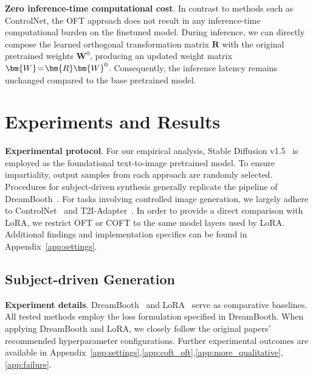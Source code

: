 \textbf{Zero inference-time computational cost}. In contrast to methods such as ControlNet, the OFT approach does not result in any inference-time computational burden on the finetuned model. During inference, we can directly compose the learned orthogonal transformation matrix $\bm{R}$ with the original pretrained weights $\bm{W}^0$, producing an updated weight matrix $\thickmuskip=2mu \medmuskip=2mu \bm{W}=\bm{R}\bm{W}^0$. Consequently, the inference latency remains unchanged compared to the base pretrained model.

\section{Experiments and Results}

\textbf{Experimental protocol}. For our empirical analysis, Stable Diffusion v1.5~\cite{rombach2022high} is employed as the foundational text-to-image pretrained model. To ensure impartiality, output samples from each approach are randomly selected. Procedures for subject-driven synthesis generally replicate the pipeline of DreamBooth~\cite{ruiz2023dreambooth}. For tasks involving controlled image generation, we largely adhere to ControlNet~\cite{zhang2023adding} and T2I-Adapter~\cite{mou2023t2i}. In order to provide a direct comparison with LoRA, we restrict OFT or COFT to the same model layers used by LoRA. Additional findings and implementation specifics can be found in Appendix~\ref{app:settings}.

\subsection{Subject-driven Generation}

\textbf{Experiment details}. DreamBooth~\cite{ruiz2023dreambooth} and LoRA~\cite{hulora2022} serve as comparative baselines. All tested methods employ the loss formulation specified in DreamBooth. When applying DreamBooth and LoRA, we closely follow the original papers’ recommended hyperparameter configurations. Further experimental outcomes are available in Appendix~\ref{app:settings},\ref{app:coft_oft},\ref{app:more_qualitative},\ref{app:failure}.

